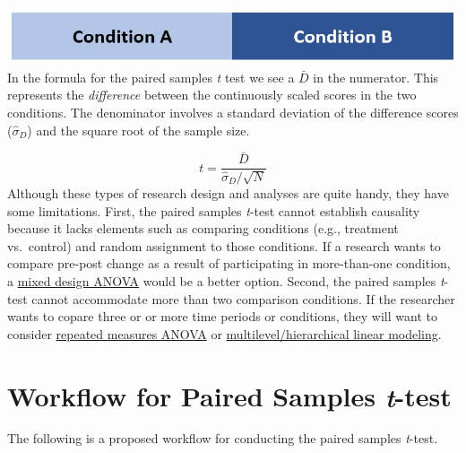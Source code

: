 \documentclass[
  11pt,
]{book}
\begin{document}
\includegraphics{images/ttests/conditions_paired.jpg}
In the formula for the paired samples \emph{t} test we see a \(\bar{D}\) in the numerator. This represents the \emph{difference} between the continuously scaled scores in the two conditions. The denominator involves a standard deviation of the difference scores (\(\hat\sigma_D\)) and the square root of the sample size.

\[t = \frac{\bar{D}}{\hat\sigma_D / \sqrt{N}}\]
Although these types of research design and analyses are quite handy, they have some limitations. First, the paired samples \emph{t}-test cannot establish causality because it lacks elements such as comparing conditions (e.g., treatment vs.~control) and random assignment to those conditions. If a research wants to compare pre-post change as a result of participating in more-than-one condition, a \protect\hyperlink{Mixed}{mixed design ANOVA} would be a better option. Second, the paired samples \emph{t}-test cannot accommodate more than two comparison conditions. If the researcher wants to copare three or or more time periods or conditions, they will want to consider \protect\hyperlink{Repeated}{repeated measures ANOVA} or \href{https://lhbikos.github.io/MultilevelModeling/}{multilevel/hierarchical linear modeling}.

\hypertarget{workflow-for-paired-samples-t-test}{%
\section{\texorpdfstring{Workflow for Paired Samples \emph{t}-test}{Workflow for Paired Samples t-test}}\label{workflow-for-paired-samples-t-test}}

The following is a proposed workflow for conducting the paired samples \emph{t}-test.
\end{document}
